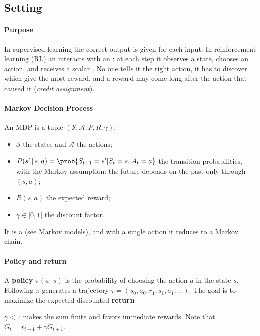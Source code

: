 \subsection{Setting}
\paragraph{Purpose}
In supervised learning the correct output is given for each input. In reinforcement learning
(RL) an  interacts with an : at each step it observes a state,
chooses an action, and receives a scalar . No one tells it the right action, it has
to discover which  give the most reward, and a reward may come long
after the action that caused it (\emph{credit assignment}).

\paragraph{Markov Decision Process}
An MDP is a tuple $\left(\mathcal{S},\mathcal{A},P,R,\gamma\right)$:
\begin{itemize}
    \item $\mathcal{S}$ the states and $\mathcal{A}$ the actions;
    \item $P(s'\,|\,s,a)=\prob{S_{t+1}=s'|S_{t}=s,A_{t}=a}$ the transition probabilities,
        with the Markov assumption: the future depends on the past only through
        $(s,a)$;
    \item $R(s,a)$ the expected reward;
    \item $\gamma\in[0,1[$ the discount factor.
\end{itemize}
It is a  (see Markov
models), and with a single action it reduces to a Markov chain.

\paragraph{Policy and return}
A \textbf{policy} $\pi(a\,|\,s)$ is the probability of choosing the action $a$ in the state
$s$. Following $\pi$ generates a trajectory $\tau=(s_{0},a_{0},r_{1},s_{1},a_{1},\dots)$.
The goal is to maximize the expected discounted \textbf{return}
\begin{center}
\end{center}
$\gamma<1$ makes the sum finite and favors immediate rewards. Note that $G_{t}=r_{t+1}+
\gamma G_{t+1}$.


